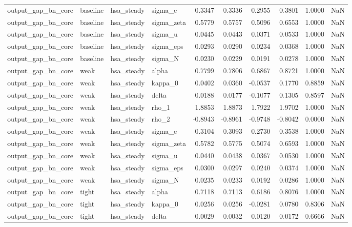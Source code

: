\begin{tabular}{llllrrrrrl}
output\_gap\_bn\_core & baseline & hsa\_steady & sigma\_e & 0.3347 & 0.3336 & 0.2955 & 0.3801 & 1.0000 & NaN \\
output\_gap\_bn\_core & baseline & hsa\_steady & sigma\_zeta & 0.5779 & 0.5757 & 0.5096 & 0.6553 & 1.0000 & NaN \\
output\_gap\_bn\_core & baseline & hsa\_steady & sigma\_u & 0.0445 & 0.0443 & 0.0371 & 0.0533 & 1.0000 & NaN \\
output\_gap\_bn\_core & baseline & hsa\_steady & sigma\_eps & 0.0293 & 0.0290 & 0.0234 & 0.0368 & 1.0000 & NaN \\
output\_gap\_bn\_core & baseline & hsa\_steady & sigma\_N & 0.0230 & 0.0229 & 0.0191 & 0.0278 & 1.0000 & NaN \\
output\_gap\_bn\_core & weak & hsa\_steady & alpha & 0.7799 & 0.7806 & 0.6867 & 0.8721 & 1.0000 & NaN \\
output\_gap\_bn\_core & weak & hsa\_steady & kappa\_0 & 0.0402 & 0.0360 & -0.0537 & 0.1770 & 0.8859 & NaN \\
output\_gap\_bn\_core & weak & hsa\_steady & delta & 0.0188 & 0.0177 & -0.1077 & 0.1305 & 0.8597 & NaN \\
output\_gap\_bn\_core & weak & hsa\_steady & rho\_1 & 1.8853 & 1.8873 & 1.7922 & 1.9702 & 1.0000 & NaN \\
output\_gap\_bn\_core & weak & hsa\_steady & rho\_2 & -0.8943 & -0.8961 & -0.9748 & -0.8042 & 0.0000 & NaN \\
output\_gap\_bn\_core & weak & hsa\_steady & sigma\_e & 0.3104 & 0.3093 & 0.2730 & 0.3538 & 1.0000 & NaN \\
output\_gap\_bn\_core & weak & hsa\_steady & sigma\_zeta & 0.5782 & 0.5775 & 0.5074 & 0.6593 & 1.0000 & NaN \\
output\_gap\_bn\_core & weak & hsa\_steady & sigma\_u & 0.0440 & 0.0438 & 0.0367 & 0.0530 & 1.0000 & NaN \\
output\_gap\_bn\_core & weak & hsa\_steady & sigma\_eps & 0.0300 & 0.0297 & 0.0240 & 0.0374 & 1.0000 & NaN \\
output\_gap\_bn\_core & weak & hsa\_steady & sigma\_N & 0.0235 & 0.0233 & 0.0192 & 0.0286 & 1.0000 & NaN \\
output\_gap\_bn\_core & tight & hsa\_steady & alpha & 0.7118 & 0.7113 & 0.6186 & 0.8076 & 1.0000 & NaN \\
output\_gap\_bn\_core & tight & hsa\_steady & kappa\_0 & 0.0256 & 0.0256 & -0.0281 & 0.0780 & 0.8306 & NaN \\
output\_gap\_bn\_core & tight & hsa\_steady & delta & 0.0029 & 0.0032 & -0.0120 & 0.0172 & 0.6666 & NaN \\

\end{tabular}

